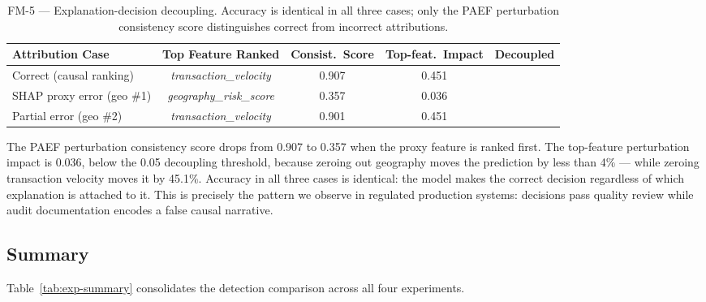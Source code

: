 \documentclass{article}
\newcommand{\yes}{\ding{51}}     %
\newcommand{\no}{\ding{55}}      %
\begin{document}
\begin{table}[t]
  \centering
  \caption{FM-5 --- Explanation-decision decoupling.  Accuracy is identical
    in all three cases; only the PAEF perturbation consistency score
    distinguishes correct from incorrect attributions.}
  \label{tab:exp-fm5}
  \small
  \renewcommand{\arraystretch}{1.2}
  \begin{tabular}{lcccc}
    \toprule
    \textbf{Attribution Case} & \textbf{Top Feature Ranked} & \textbf{Consist.\ Score} & \textbf{Top-feat.\ Impact} & \textbf{Decoupled} \\
    \midrule
    Correct (causal ranking)    & \emph{transaction\_velocity}  & 0.907 & 0.451 & \no  \\
    SHAP proxy error (geo \#1)  & \emph{geography\_risk\_score}  & 0.357 & 0.036 & \yes \\
    Partial error (geo \#2)     & \emph{transaction\_velocity}   & 0.901 & 0.451 & \no  \\
    \bottomrule
  \end{tabular}
\end{table}

The PAEF perturbation consistency score drops from 0.907 to 0.357 when the
proxy feature is ranked first.  The top-feature perturbation impact is
0.036, below the 0.05 decoupling threshold, because zeroing out geography
moves the prediction by less than 4\% --- while zeroing transaction velocity
moves it by 45.1\%.  Accuracy in all three cases is identical: the model
makes the correct decision regardless of which explanation is attached to it.
This is precisely the pattern we observe in regulated production systems:
decisions pass quality review while audit documentation encodes a false
causal narrative.

\subsection{Summary}
\label{sec:exp-summary}

Table~\ref{tab:exp-summary} consolidates the detection comparison across
all four experiments.
\end{document}
